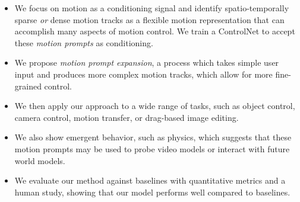 \begin{itemize}
    \item We focus on motion as a conditioning signal and identify spatio-temporally sparse \emph{or} dense motion tracks as a flexible motion representation that can accomplish many aspects of motion control. We train a ControlNet to accept these \emph{motion prompts} as conditioning.
    \item We propose \emph{motion prompt expansion}, a process which takes simple user input and produces more complex motion tracks, which allow for more fine-grained control. 
    \item We then apply our approach to a wide range of tasks, such as object control, camera control, motion transfer, or drag-based image editing. 
    \item We also show emergent behavior, such as physics, which suggests that these motion prompts may be used to probe video models or interact with future world models.
    \item We evaluate our method against baselines with quantitative metrics and a human study, showing that our model performs well compared to baselines.
\end{itemize}

